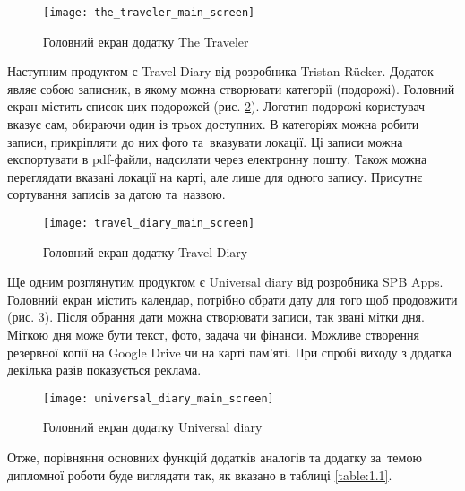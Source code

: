 \documentclass[../main.tex]{subfiles}
\begin{document}
{\begin{figure}[H]
	\centering
	\texttt{[image: the\_traveler\_main\_screen]}
	\caption{Головний екран додатку The Traveler}
	\label{figure:1.2}
\end{figure}

Наступним продуктом є Travel Diary від розробника Tristan Rücker. Додаток являє собою записник, в якому можна створювати категорії (подорожі). Головний екран містить список цих подорожей (рис. \ref{figure:1.3}). Логотип подорожі користувач вказує сам, обираючи один із трьох доступних. В категоріях можна робити записи, прикріпляти до них фото та~вказувати локації. Ці записи можна експортувати в pdf-файли, надсилати через електронну пошту. Також можна переглядати вказані локації на карті, але лише для одного запису. Присутнє сортування записів за датою та~назвою.

\begin{figure}[H]
\centering
\texttt{[image: travel\_diary\_main\_screen]}
\caption{Головний екран додатку Travel Diary}
\label{figure:1.3}
\end{figure}

Ще одним розглянутим продуктом є Universal diary від розробника SPB Apps. Головний екран містить календар, потрібно обрати дату для того щоб продовжити (рис. \ref{figure:1.4}). Після обрання дати можна створювати записи, так звані мітки дня. Міткою дня може бути текст, фото, задача чи фінанси. Можливе створення резервної копії на Google Drive чи на карті пам'яті. При спробі виходу з додатка декілька разів показується реклама.

\begin{figure}[H]
\centering
\texttt{[image: universal\_diary\_main\_screen]}
\caption{Головний екран додатку Universal diary}
\label{figure:1.4}
\end{figure}

Отже, порівняння основних функцій додатків аналогів та додатку за~темою дипломної роботи буде виглядати так, як вказано в таблиці \ref{table:1.1}.

}
\end{document}

